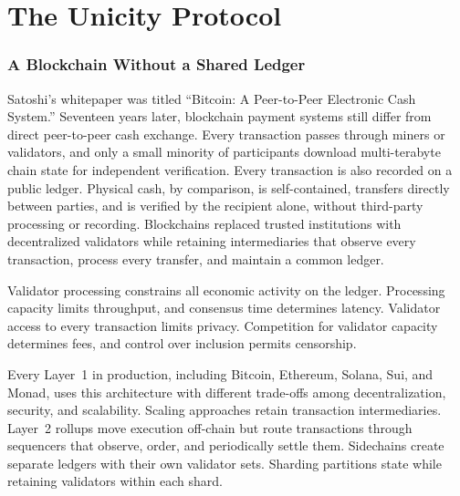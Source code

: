 \part{The Unicity Protocol}\label{part:protocol}

\section{A Blockchain Without a Shared Ledger}

Satoshi's whitepaper was titled ``Bitcoin: A Peer-to-Peer Electronic Cash System.'' Seventeen years later, blockchain payment systems still differ from direct peer-to-peer cash exchange. Every transaction passes through miners or validators, and only a small minority of participants download multi-terabyte chain state for independent verification. Every transaction is also recorded on a public ledger. Physical cash, by comparison, is self-contained, transfers directly between parties, and is verified by the recipient alone, without third-party processing or recording. Blockchains replaced trusted institutions with decentralized validators while retaining intermediaries that observe every transaction, process every transfer, and maintain a common ledger.

Validator processing constrains all economic activity on the ledger. Processing capacity limits throughput, and consensus time determines latency. Validator access to every transaction limits privacy. Competition for validator capacity determines fees, and control over inclusion permits censorship.

Every Layer~1 in production, including Bitcoin, Ethereum, Solana, Sui, and Monad, uses this architecture with different trade-offs among decentralization, security, and scalability. Scaling approaches retain transaction intermediaries. Layer~2 rollups move execution off-chain but route transactions through sequencers that observe, order, and periodically settle them. Sidechains create separate ledgers with their own validator sets. Sharding partitions state while retaining validators within each shard.

